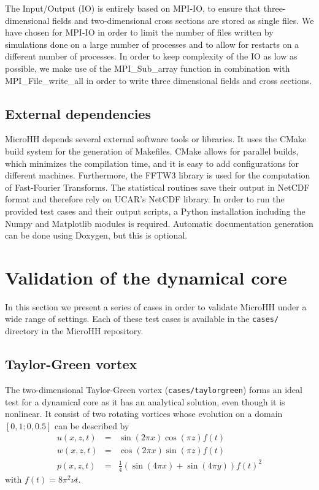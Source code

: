 \documentclass[gmd]{copernicus}
\begin{document}
The Input/Output (IO) is entirely based on MPI-IO, to ensure that three-dimensional fields and two-dimensional cross sections are stored as single files. We have chosen for MPI-IO in order to limit the number of files written by simulations done on a large number of processes and to allow for restarts on a different number of processes. In order to keep complexity of the IO as low as possible, we make use of the MPI\_Sub\_array function in combination with MPI\_File\_write\_all in order to write three dimensional fields and cross sections.

\subsection{External dependencies}
MicroHH depends several external software tools or libraries. It uses the CMake build system for the generation of Makefiles. CMake allows for parallel builds, which minimizes the compilation time, and it is easy to add configurations for different machines. Furthermore, the FFTW3 library \citep{Frigo2005} is used for the computation of Fast-Fourier Transforms. The statistical routines save their output in NetCDF format and therefore rely on UCAR's NetCDF library. In order to run the provided test cases and their output scripts, a Python installation including the Numpy and Matplotlib modules is required. Automatic documentation generation can be done using Doxygen, but this is optional.

\section{Validation of the dynamical core} \label{sec:tests}
In this section we present a series of cases in order to validate MicroHH under a wide range of settings. Each of these test cases is available in the \texttt{cases/} directory in the MicroHH repository.

\subsection{Taylor-Green vortex}
The two-dimensional Taylor-Green vortex (\texttt{cases/taylorgreen}) forms an ideal test for a dynamical core as it has an analytical solution, even though it is nonlinear. It consist of two rotating vortices whose evolution on a domain $\left[0,1; 0,0.5 \right]$ can be described by
\begin{eqnarray}
u(x,z,t) & = & \sin(2\pi x) \cos(\pi z) f(t)\\
w(x,z,t) & = & \cos(2\pi x) \sin(\pi z) f(t)\\
p(x,z,t) & = & \tfrac{1}{4} \left(\sin(4 \pi x) + \sin(4 \pi y) \right) f(t)^2
\end{eqnarray}
with $f(t) = 8 \pi^2 \nu t$.
\end{document}
